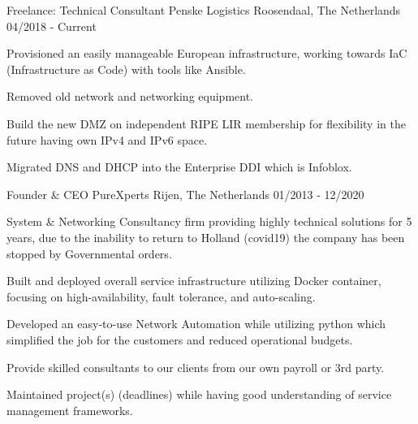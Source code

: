 

\begin{cventries}

\cventry
	{Freelance: Technical Consultant}  %
    {Penske Logistics} %
    {Roosendaal, The Netherlands} %
    {04/2018 - Current} %
    {
      \begin{cvitems} %
       \item {Provisioned an easily manageable European infrastructure, working towards IaC (Infrastructure as Code) with tools like Ansible.}
       \item {Removed old network and networking equipment.}
       \item {Build the new DMZ on independent RIPE LIR membership for flexibility in the future having own IPv4 and IPv6 space.}
       \item {Migrated DNS and DHCP into the Enterprise DDI which is Infoblox.}
       \end{cvitems}
	}
  \cventry
    {Founder \& CEO} %
    {PureXperts} %
    {Rijen, The Netherlands} %
    {01/2013 - 12/2020} %
    {
      \begin{cvitems} %
      \item {System \& Networking Consultancy firm providing highly technical solutions for 5 years, due to the inability to return to Holland (covid19) the company has been stopped by Governmental orders.}
        \item {Built and deployed overall service infrastructure utilizing Docker container, focusing on high-availability, fault tolerance, and auto-scaling.}
        \item {Developed an easy-to-use Network Automation while utilizing python which simplified the job for the customers and reduced operational budgets.}
	\item {Provide skilled consultants to our clients from our own payroll or 3rd party.}
	\item {Maintained project(s) (deadlines) while having good understanding of service management frameworks.}

\end{cvitems}}
\end{cventries}
